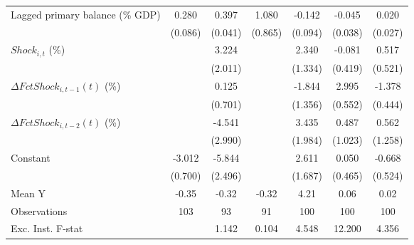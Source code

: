 {\begin{tabular}{l*{6}{c}}
\addlinespace
Lagged primary balance (\% GDP)&       0.280\sym{***}&       0.397\sym{***}&       1.080         &      -0.142         &      -0.045         &       0.020         \\
                    &     (0.086)         &     (0.041)         &     (0.865)         &     (0.094)         &     (0.038)         &     (0.027)         \\
\addlinespace
$ Shock_{i,t}$ (\%) &                     &       3.224         &                     &       2.340         &      -0.081         &       0.517         \\
                    &                     &     (2.011)         &                     &     (1.334)         &     (0.419)         &     (0.521)         \\
\addlinespace
$ \Delta FctShock_{i,t-1}(t)$ (\%)&                     &       0.125         &                     &      -1.844         &       2.995\sym{***}&      -1.378\sym{***}\\
                    &                     &     (0.701)         &                     &     (1.356)         &     (0.552)         &     (0.444)         \\
\addlinespace
$ \Delta FctShock_{i,t-2}(t)$ (\%)&                     &      -4.541         &                     &       3.435         &       0.487         &       0.562         \\
                    &                     &     (2.990)         &                     &     (1.984)         &     (1.023)         &     (1.258)         \\
\addlinespace
Constant            &      -3.012\sym{***}&      -5.844\sym{**} &                     &       2.611         &       0.050         &      -0.668         \\
                    &     (0.700)         &     (2.496)         &                     &     (1.687)         &     (0.465)         &     (0.524)         \\
\midrule
Mean Y              &       -0.35         &       -0.32         &       -0.32         &        4.21         &        0.06         &        0.02         \\
Observations        &         103         &          93         &          91         &         100         &         100         &         100         \\
Exc. Inst. F-stat   &                     &       1.142         &       0.104         &       4.548         &      12.200         &       4.356         \\
\bottomrule
\end{tabular}
}
